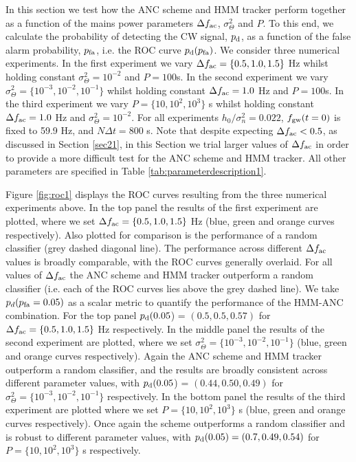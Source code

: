 \documentclass[pra,superscriptaddress,reprint,amsmath,amssymb,nofootinbib]{revtex4-2}
\begin{document}
In this section we test how the ANC scheme and HMM tracker perform together as a function of the mains power parameters $\Delta f_{\rm ac}$, $\sigma_\Theta^2$ and $P$. To this end, we calculate the probability of detecting the CW signal, $p_{\rm d}$, as a function of the false alarm probability, $p_{\rm fa}$, i.e. the ROC curve $p_{\rm d} (p_{\rm fa})$. We consider three numerical experiments. In the first experiment we vary $\Delta f_{\rm ac} =  \{0.5, 1.0, 1.5\}$ Hz whilst holding constant $\sigma_{\Theta}^2 = 10^{-2}$ and $P = 100 $s. In the second experiment we vary $\sigma_{\Theta}^2 =  \{ 10^{-3}, 10^{-2}, 10^{-1}\}$ whilst holding constant $\Delta f_{\rm ac} = 1.0$ Hz and $P = 100 $s. In the third experiment we vary $P=  \{ 10, 10^2, 10^3\}$ s whilst holding constant $\Delta f_{\rm ac} = 1.0$ Hz and $\sigma_{\Theta}^2 = 10^{-2}$. For all experiments $h_0 / \sigma_n^2 = 0.022$, $f_{\rm gw}(t=0)$ is fixed to 59.9 Hz, and $N \Delta t = 800$ s. Note that despite expecting $\Delta f_{\rm ac} < 0.5$, as discussed in Section \ref{sec21}, in this Section we trial larger values of $\Delta f_{\rm ac}$ in order to provide a more difficult test for the ANC scheme and HMM tracker. All other parameters are specified in Table \ref{tab:parameterdescription1}. \newline 


Figure \ref{fig:roc1} displays the ROC curves resulting from the three numerical experiments above. In the top panel the results of the first experiment are plotted, where we set  $\Delta f_{\rm ac} = \{0.5, 1.0, 1.5\}$ Hz (blue, green and orange curves respectively). Also plotted for comparison is the performance of a random classifier (grey dashed diagonal line). The performance across different $\Delta f_{\rm ac}$ values is broadly comparable, with the ROC curves generally overlaid. For all values of $\Delta f_{\rm ac}$ the ANC scheme and HMM tracker outperform a random classifier (i.e. each of the ROC curves lies above the grey dashed line). We take $p_{d}(p_{\rm fa} =0.05)$ as a scalar metric to quantify the performance of the HMM-ANC combination. For the top panel $p_{\rm d}(0.05$) = $(0.5, 0.5, 0.57)$ for $\Delta f_{\rm ac} =  \{0.5, 1.0, 1.5\}$ Hz respectively. In the middle panel the results of the second experiment are plotted, where we set  $\sigma_{\Theta}^2 =  \{ 10^{-3}, 10^{-2}, 10^{-1}\}$  (blue, green and orange curves respectively). Again the ANC scheme and HMM tracker outperform a random classifier, and the results are broadly consistent across different parameter values, with $p_{\rm d}(0.05$) = $(0.44,0.50,0.49)$ for $\sigma_{\Theta}^2 =  \{ 10^{-3}, 10^{-2}, 10^{-1}\}$ respectively. In the bottom panel the results of the third experiment are plotted where we set $P=  \{ 10, 10^2, 10^3\}$ s (blue, green and orange curves respectively). Once again the scheme outperforms a random classifier and is robust to different parameter values, with $p_{\rm d}(0.05) = (0.7,0.49,0.54)$ for $P=  \{ 10, 10^2, 10^3\}$ s respectively.
\end{document}
